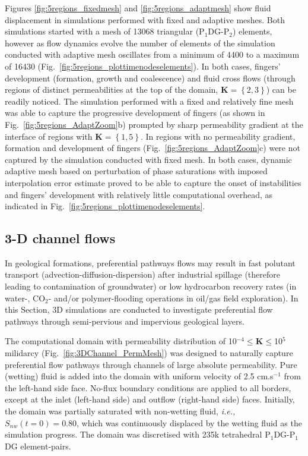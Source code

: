 \documentclass[preprint,authoryear,12pt]{elsarticle}
\newcommand{\PN}[2][error]{P$_{#1}$DG-P$_{#2}$}
\newcommand{\PNDG}[2][error]{P$_{#1}$DG-P$_{#2}$DG}
\newcommand{\ie}{{\it i.e., }}
\begin{document}
\medskip
Figures \ref{fig:5regions_fixedmesh} and \ref{fig:5regions_adaptmesh} show fluid displacement in simulations performed with fixed and adaptive meshes. Both simulations started with a mesh of 13068 triangular (\PN[1]{2}) elements, however as flow dynamics evolve the number of elements of the simulation conducted with adaptive mesh oscillates from a minimum of 4400 to a maximum of 16430 (Fig.~\ref{fig:5regions_plottimenodeselements}). In both cases, fingers' development (formation, growth and coalescence) and fluid cross flows (through regions of distinct permeabilities at the top of the domain, $\mathbf{K}=\left\{2,3\right\}$) can be readily noticed. The simulation performed with a fixed and relatively fine mesh was able to capture the progressive development of fingers (as shown in Fig.~\ref{fig:5regions_AdaptZoom}b) prompted by sharp permeability gradient at the interface of regions with $\mathbf{K}=\left\{1,5\right\}$. In regions with no permeability gradient, formation and development of fingers (Fig.~\ref{fig:5regions_AdaptZoom}c) were not captured by the simulation conducted with fixed mesh. In both cases, dynamic adaptive mesh based on perturbation of phase saturations with imposed interpolation error estimate proved to be able to capture the onset of instabilities and fingers' development with relatively little computational overhead, as indicated in Fig.~\ref{fig:5regions_plottimenodeselements}.   

\subsection{3-D channel flows} \label{section:results_3D} 
In geological formations, preferential pathways flows may result in fast polutant transport (advection-diffusion-dispersion) after industrial spillage (therefore leading to contamination of groundwater) or low hydrocarbon recovery rates (in water-, CO$_{2}$- and/or polymer-flooding operations in oil/gas field exploration). In this Section, 3D simulations are conducted to investigate preferential flow pathways through semi-pervious and impervious geological layers. 


\medskip
The computational domain with permeability distribution of 10$^{-4}\le\mathbf{K}\le$10$^{5}$  milidarcy (Fig.~\ref{fig:3DChannel_PermMesh})  was designed to naturally capture preferential flow pathways through channels of large absolute permeability. Pure (wetting) fluid is added into the domain with uniform velocity of 2.5 cm.s$^{-1}$ from the left-hand side face. No-flux boundary conditions are applied to all borders, except at the inlet (left-hand side) and outflow (right-hand side) faces. Initially, the domain was partially saturated with non-wetting fluid, \ie $S_{nw}(t=0)=0.80$, which was continuously displaced by the wetting fluid as the simulation progress. The domain was discretised with 235k tetrahedral \PNDG[1]{1} element-pairs.
\end{document}
